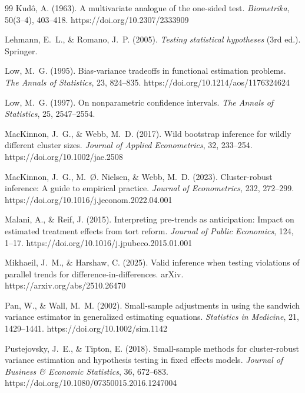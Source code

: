 \documentclass[12pt]{article}
\theoremstyle{definition}
\numberwithin{equation}{section}
\begin{document}
\begin{thebibliography}{99}
 Kud\^o, A. (1963). A multivariate analogue of the one-sided test. \emph{Biometrika}, 50(3--4), 403--418. https://doi.org/10.2307/2333909

 Lehmann, E.~L., \& Romano, J.~P. (2005). \emph{Testing statistical hypotheses} (3rd ed.). Springer.

 Low, M.~G. (1995). Bias-variance tradeoffs in functional estimation problems. \emph{The Annals of Statistics}, 23, 824--835. https://doi.org/10.1214/aos/1176324624

 Low, M.~G. (1997). On nonparametric confidence intervals. \emph{The Annals of Statistics}, 25, 2547--2554.

 MacKinnon, J.~G., \& Webb, M.~D. (2017). Wild bootstrap inference for wildly different cluster sizes. \emph{Journal of Applied Econometrics}, 32, 233--254. https://doi.org/10.1002/jae.2508

 MacKinnon, J.~G., M.~{\O}. Nielsen, \& Webb, M.~D. (2023). Cluster-robust inference: A guide to empirical practice. \emph{Journal of Econometrics}, 232, 272--299. https://doi.org/10.1016/j.jeconom.2022.04.001

 Malani, A., \& Reif, J. (2015). Interpreting pre-trends as anticipation: Impact on estimated treatment effects from tort reform. \emph{Journal of Public Economics}, 124, 1--17. https://doi.org/10.1016/j.jpubeco.2015.01.001

 Mikhaeil, J.~M., \& Harshaw, C. (2025). Valid inference when testing violations of parallel trends for difference-in-differences. arXiv. https://arxiv.org/abs/2510.26470

 Pan, W., \& Wall, M.~M. (2002). Small-sample adjustments in using the sandwich variance estimator in generalized estimating equations. \emph{Statistics in Medicine}, 21, 1429--1441. https://doi.org/10.1002/sim.1142

 Pustejovsky, J.~E., \& Tipton, E. (2018). Small-sample methods for cluster-robust variance estimation and hypothesis testing in fixed effects models. \emph{Journal of Business \& Economic Statistics}, 36, 672--683. https://doi.org/10.1080/07350015.2016.1247004


\end{thebibliography}
\end{document}
